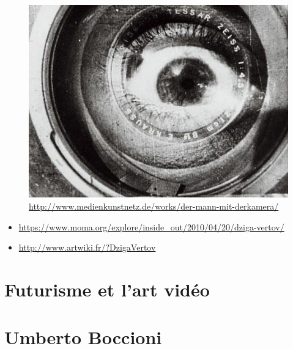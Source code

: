 \documentclass[
  french,
]{book}
\providecommand{\tightlist}{%
  \setlength{\itemsep}{0pt}\setlength{\parskip}{0pt}}
\begin{document}
\begin{figure}
\centering
\includegraphics{medias/corpus/vertov/bild.jpg}
\caption{\url{http://www.medienkunstnetz.de/works/der-mann-mit-derkamera/}}
\end{figure}

\begin{itemize}
\tightlist
\item
  \url{https://www.moma.org/explore/inside_out/2010/04/20/dziga-vertov/}
\item
  \url{http://www.artwiki.fr/?DzigaVertov}
\end{itemize}

\hypertarget{futurisme-et-lart-viduxe9o}{%
\section{Futurisme et l'art vidéo}\label{futurisme-et-lart-viduxe9o}}

\hypertarget{umberto-boccioni}{%
\section{Umberto Boccioni}\label{umberto-boccioni}}
\end{document}
